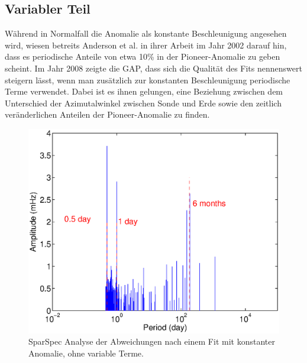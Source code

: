 
\subsection{Variabler Teil}
Während in Normalfall die Anomalie als konstante Beschleunigung angesehen wird, wiesen betreits Anderson et al. in
ihrer Arbeit im Jahr 2002 darauf hin, dass es periodische Anteile von etwa 10\% in der Pioneer-Anomalie zu
geben scheint.
Im Jahr 2008 zeigte die GAP\cite{Levy2008}, dass sich die Qualität des Fits nennenswert steigern lässt, wenn man zusätzlich zur konstanten Beschleunigung periodische Terme verwendet.
Dabei ist es ihnen gelungen, eine Beziehung zwischen dem Unterschied der Azimutalwinkel zwischen Sonde und Erde sowie
den zeitlich veränderlichen Anteilen der Pioneer-Anomalie zu finden. %

\begin{figure}[htnb]
\begin{minipage}[t]{.48\linewidth}
	\centering
	\includegraphics[width=\linewidth]{images/SparSpec_begining}
  \caption{SparSpec Analyse der Abweichungen nach einem Fit mit konstanter Anomalie, ohne variable Terme.}\label{fig:SparSpec_pre}
\end{minipage}
\hfill
\begin{minipage}[t]{.48\linewidth}
	\centering

\end{minipage}
\end{figure}
